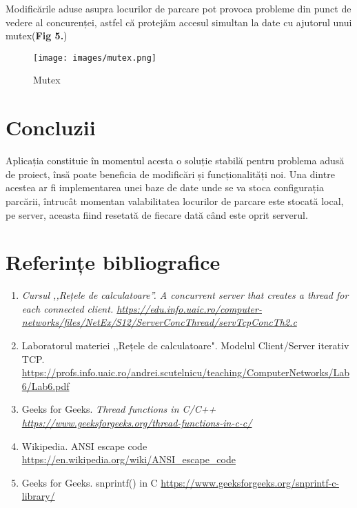 \documentclass[runningheads]{llncs}
\begin{document}
\par Modificările aduse asupra locurilor de
parcare pot provoca probleme din punct de vedere al concurenței, astfel că protejăm accesul simultan la date cu ajutorul unui mutex(\textbf{Fig 5.})

\begin{figure}[H]
    \centering
    \begin{minipage}{1\textwidth}
        \centering
        \texttt{[image: images/mutex.png]}
        \caption{Mutex}
        \label{fig:mutex}
    \end{minipage}\hfill
\end{figure}

\section{Concluzii}
Aplicația constituie în momentul acesta o soluție stabilă pentru problema adusă de proiect, însă poate beneficia de modificări și funcționalități noi. Una dintre acestea ar fi implementarea unei baze de date unde se va stoca configurația parcării, întrucât momentan valabilitatea locurilor de parcare este stocată local, pe server, aceasta fiind resetată de fiecare dată când este oprit serverul.   
\section{Referințe bibliografice}
\begin{enumerate}
 \item \slshape{Cursul ,,Rețele de calculatoare”. A concurrent server that creates a thread for each connected client}. 
 \url{https://edu.info.uaic.ro/computer-networks/files/NetEx/S12/ServerConcThread/servTcpConcTh2.c}
 \item Laboratorul materiei ,,Rețele de calculatoare". Modelul Client/Server iterativ TCP.
 \url{https://profs.info.uaic.ro/andrei.scutelnicu/teaching/ComputerNetworks/Lab6/Lab6.pdf}
 \item Geeks for Geeks. \slshape{Thread functions in C/C++}
 \url{https://www.geeksforgeeks.org/thread-functions-in-c-c/}
 \item Wikipedia. ANSI escape code 
 \url{https://en.wikipedia.org/wiki/ANSI_escape_code}
 \item Geeks for Geeks. snprintf() in C
 \url{https://www.geeksforgeeks.org/snprintf-c-library/}
 
\end{enumerate}
\end{document}
